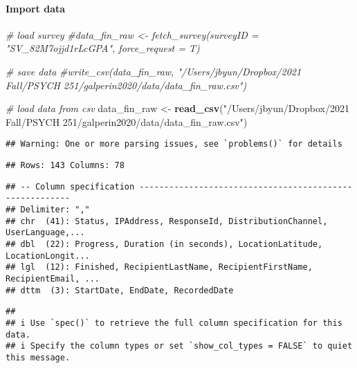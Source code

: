 \documentclass[]{article}
\newenvironment{Shaded}{\begin{snugshade}}{\end{snugshade}}
\newcommand{\CommentTok}[1]{\textcolor[rgb]{0.56,0.35,0.01}{\textit{#1}}}
\newcommand{\KeywordTok}[1]{\textcolor[rgb]{0.13,0.29,0.53}{\textbf{#1}}}
\newcommand{\NormalTok}[1]{#1}
\newcommand{\StringTok}[1]{\textcolor[rgb]{0.31,0.60,0.02}{#1}}
\let\oldparagraph\paragraph
\renewcommand{\paragraph}[1]{\oldparagraph{#1}\mbox{}}
\begin{document}
\hypertarget{import-data}{%
\paragraph{Import data}\label{import-data}}

\begin{Shaded}
\begin{Highlighting}[]
\CommentTok{# load survey}
\CommentTok{#data_fin_raw <- fetch_survey(surveyID = "SV_82M7ojjd1rLcGPA", force_request = T)}
\end{Highlighting}
\end{Shaded}

\begin{Shaded}
\begin{Highlighting}[]
\CommentTok{# save data}
\CommentTok{#write_csv(data_fin_raw, "/Users/jbyun/Dropbox/2021 Fall/PSYCH 251/galperin2020/data/data_fin_raw.csv")}
\end{Highlighting}
\end{Shaded}

\begin{Shaded}
\begin{Highlighting}[]
\CommentTok{# load data from csv}
\NormalTok{data_fin_raw <-}\StringTok{ }\KeywordTok{read_csv}\NormalTok{(}\StringTok{"/Users/jbyun/Dropbox/2021 Fall/PSYCH 251/galperin2020/data/data_fin_raw.csv"}\NormalTok{)}
\end{Highlighting}
\end{Shaded}

\begin{verbatim}
## Warning: One or more parsing issues, see `problems()` for details
\end{verbatim}

\begin{verbatim}
## Rows: 143 Columns: 78
\end{verbatim}

\begin{verbatim}
## -- Column specification --------------------------------------------------------
## Delimiter: ","
## chr  (41): Status, IPAddress, ResponseId, DistributionChannel, UserLanguage,...
## dbl  (22): Progress, Duration (in seconds), LocationLatitude, LocationLongit...
## lgl  (12): Finished, RecipientLastName, RecipientFirstName, RecipientEmail, ...
## dttm  (3): StartDate, EndDate, RecordedDate
\end{verbatim}

\begin{verbatim}
## 
## i Use `spec()` to retrieve the full column specification for this data.
## i Specify the column types or set `show_col_types = FALSE` to quiet this message.
\end{verbatim}
\end{document}
